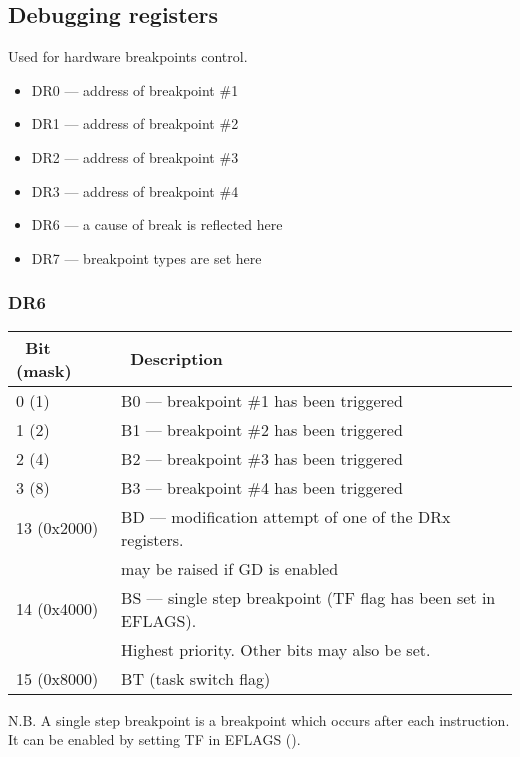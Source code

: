 \subsection{Debugging registers}

Used for hardware breakpoints control.

\begin{itemize}
	\item DR0 --- address of breakpoint \#1
	\item DR1 --- address of breakpoint \#2
	\item DR2 --- address of breakpoint \#3
	\item DR3 --- address of breakpoint \#4
	\item DR6 --- a cause of break is reflected here
	\item DR7 --- breakpoint types are set here
\end{itemize}

\subsubsection{DR6}

\begin{center}
\begin{tabular}{ | l | l | }
\hline
\headercolor\ Bit (mask) &
\headercolor\ Description \\
\hline
0 (1)       &  B0 --- breakpoint \#1 has been triggered \\
\hline
1 (2)       &  B1 --- breakpoint \#2 has been triggered \\
\hline
2 (4)       &  B2 --- breakpoint \#3 has been triggered \\
\hline
3 (8)       &  B3 --- breakpoint \#4 has been triggered \\
\hline
13 (0x2000) &  BD --- modification attempt of one of the DRx registers. \\
            &  may be raised if GD is enabled \\
\hline
14 (0x4000) &  BS --- single step breakpoint (TF flag has been set in EFLAGS). \\
	    &  Highest priority. Other bits may also be set. \\
\hline
15 (0x8000) &  BT (task switch flag) \\
\hline
\end{tabular}
\end{center}

N.B. A single step breakpoint is a breakpoint which occurs after each instruction.
It can be enabled by setting TF in EFLAGS ().

